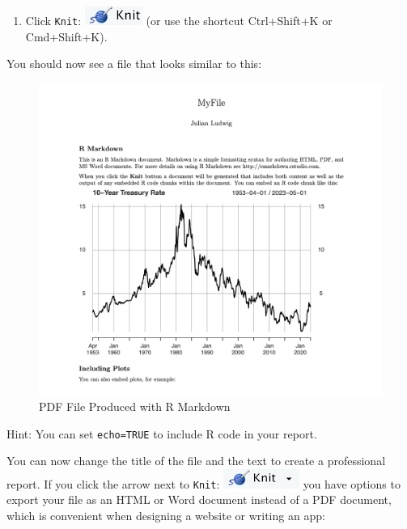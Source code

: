 \documentclass[
]{book}
\providecommand{\tightlist}{%
  \setlength{\itemsep}{0pt}\setlength{\parskip}{0pt}}
\begin{document}
\begin{enumerate}
\def\labelenumi{\arabic{enumi}.}
\setcounter{enumi}{17}
\tightlist
\item
  Click \texttt{Knit}: \includegraphics{files/icons-rstudio/knit.png} (or use the shortcut Ctrl+Shift+K or Cmd+Shift+K).
\end{enumerate}

You should now see a file that looks similar to this:

\begin{figure}
\centering
\includegraphics{files/icons-rstudio/example_rmarkdown_medium.png}
\caption{\label{fig:example-rmarkdown}PDF File Produced with R Markdown}
\end{figure}

Hint: You can set \texttt{echo=TRUE} to include R code in your report.

You can now change the title of the file and the text to create a professional report. If you click the arrow next to \texttt{Knit}: \includegraphics{files/icons-rstudio/knitdown.png} you have options to export your file as an HTML or Word document instead of a PDF document, which is convenient when designing a website or writing an app:
\end{document}
